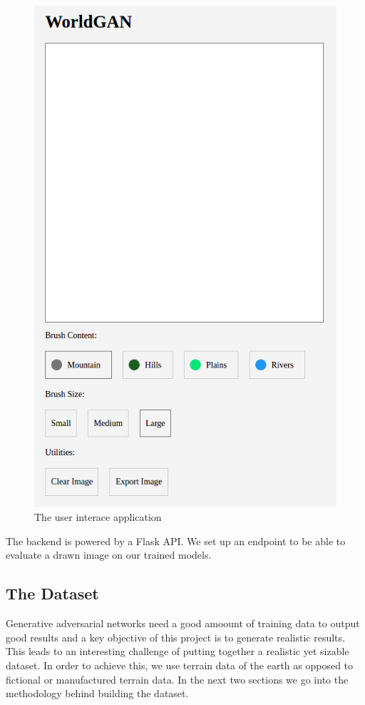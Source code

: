 \documentclass[twocolumn]{article}
\begin{document}
	\begin{figure}[h!]
	\includegraphics[width=1\columnwidth]{ui.png} 
	\caption{The user interace application}
	\end{figure}
	
	The backend is powered by a Flask API. We set up an endpoint to be able to evaluate a drawn image on our trained models.
	
	\subsection{The Dataset}
	
	Generative adversarial networks need a good amoount of training data to output good results and a key objective of this project is to generate realistic results. This leads to an interesting challenge of putting together a realistic yet sizable dataset. In order to achieve this, we use terrain data of the earth as opposed to fictional or manufactured terrain data. In the next two sections we go into the methodology behind building the dataset.
\end{document}
